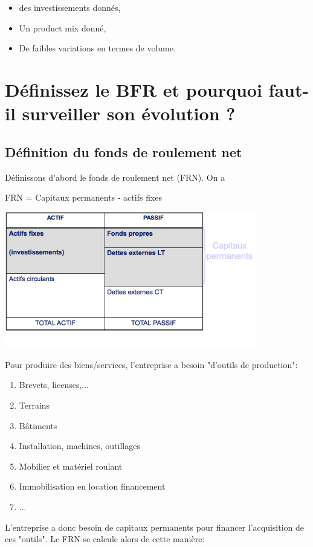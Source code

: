 \documentclass{article}
\begin{document}
\begin{itemize}
	\item des investissements donnés,
	\item Un product mix donné,
	\item De faibles variations en termes de volume.
\end{itemize}

\section{Définissez le BFR et pourquoi faut-il surveiller son évolution ?}

\subsection{Définition du fonds de roulement net}
Définissons d'abord le fonds de roulement net (FRN). On a
\begin{center}
	FRN = Capitaux permanents - actifs fixes
\end{center}

\includegraphics[width=11cm]{c6.png}

Pour produire des biens/services, l'entreprise a besoin "d'outils de production":
\begin{enumerate}
	\item Brevets, licenses,...
	\item Terrains
	\item Bâtiments
	\item Installation, machines, outillages
	\item Mobilier et matériel roulant
	\item Immobilisation en location financement
	\item ... 
\end{enumerate}

L'entreprise a donc besoin de capitaux permanents pour financer l'acquisition de ces "outils". Le FRN se calcule alors de cette manière:
\end{document}
